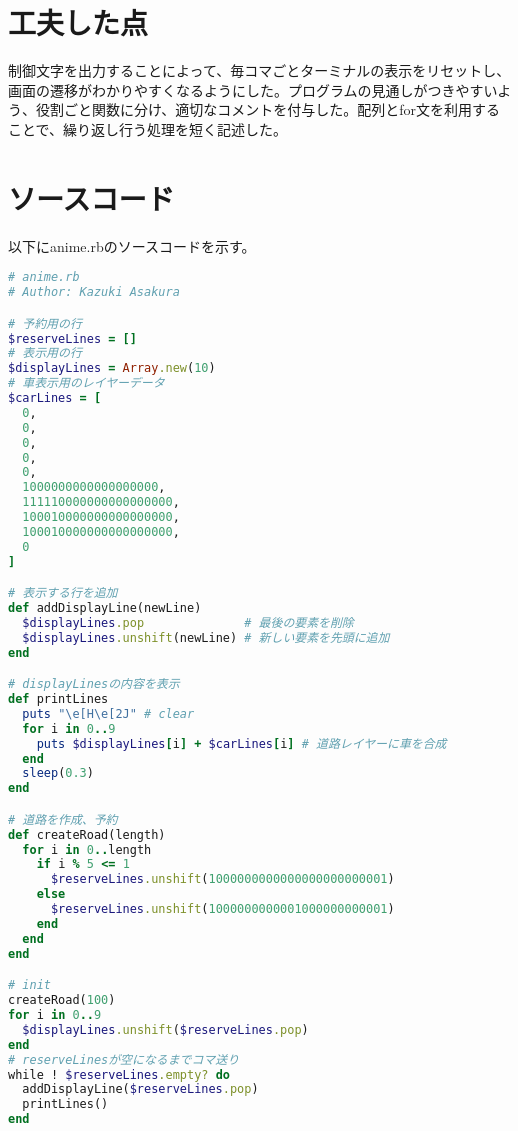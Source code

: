 \documentclass{jsarticle}
\begin{document}
\section{工夫した点}

制御文字を出力することによって、毎コマごとターミナルの表示をリセットし、画面の遷移がわかりやすくなるようにした。プログラムの見通しがつきやすいよう、役割ごと関数に分け、適切なコメントを付与した。配列とfor文を利用することで、繰り返し行う処理を短く記述した。

\section{ソースコード}

以下にanime.rbのソースコードを示す。

\begin{lstlisting}[language=ruby]
# anime.rb
# Author: Kazuki Asakura

# 予約用の行
$reserveLines = []
# 表示用の行
$displayLines = Array.new(10)
# 車表示用のレイヤーデータ
$carLines = [
  0,
  0,
  0,
  0,
  0,
  1000000000000000000,
  111110000000000000000,
  100010000000000000000,
  100010000000000000000,
  0
]

# 表示する行を追加
def addDisplayLine(newLine)
  $displayLines.pop              # 最後の要素を削除
  $displayLines.unshift(newLine) # 新しい要素を先頭に追加
end

# displayLinesの内容を表示
def printLines
  puts "\e[H\e[2J" # clear
  for i in 0..9
    puts $displayLines[i] + $carLines[i] # 道路レイヤーに車を合成
  end
  sleep(0.3)
end

# 道路を作成、予約
def createRoad(length)
  for i in 0..length
    if i % 5 <= 1
      $reserveLines.unshift(1000000000000000000000001)
    else
      $reserveLines.unshift(1000000000001000000000001)
    end
  end
end

# init
createRoad(100)
for i in 0..9
  $displayLines.unshift($reserveLines.pop)
end
# reserveLinesが空になるまでコマ送り
while ! $reserveLines.empty? do
  addDisplayLine($reserveLines.pop)
  printLines()
end
\end{lstlisting}
\end{document}
